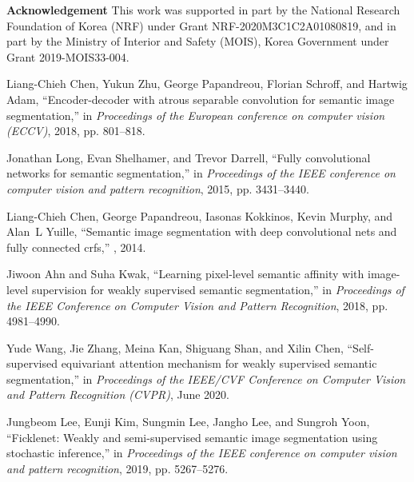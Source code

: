 \documentclass{article}
\begin{document}
\textbf{Acknowledgement} 
This work was supported in part by the National Research Foundation of Korea (NRF) under Grant NRF-2020M3C1C2A01080819, and in part by the Ministry of Interior and Safety (MOIS), Korea Government under Grant 2019-MOIS33-004.  








\begin{thebibliography}{10}

Liang-Chieh Chen, Yukun Zhu, George Papandreou, Florian Schroff, and Hartwig
  Adam,
\newblock ``Encoder-decoder with atrous separable convolution for semantic
  image segmentation,''
\newblock in {\em Proceedings of the European conference on computer vision
  (ECCV)}, 2018, pp. 801--818.

Jonathan Long, Evan Shelhamer, and Trevor Darrell,
\newblock ``Fully convolutional networks for semantic segmentation,''
\newblock in {\em Proceedings of the IEEE conference on computer vision and
  pattern recognition}, 2015, pp. 3431--3440.

Liang-Chieh Chen, George Papandreou, Iasonas Kokkinos, Kevin Murphy, and Alan~L
  Yuille,
\newblock ``Semantic image segmentation with deep convolutional nets and fully
  connected crfs,''
, 2014.

Jiwoon Ahn and Suha Kwak,
\newblock ``Learning pixel-level semantic affinity with image-level supervision
  for weakly supervised semantic segmentation,''
\newblock in {\em Proceedings of the IEEE Conference on Computer Vision and
  Pattern Recognition}, 2018, pp. 4981--4990.

Yude Wang, Jie Zhang, Meina Kan, Shiguang Shan, and Xilin Chen,
\newblock ``Self-supervised equivariant attention mechanism for weakly
  supervised semantic segmentation,''
\newblock in {\em Proceedings of the IEEE/CVF Conference on Computer Vision and
  Pattern Recognition (CVPR)}, June 2020.

Jungbeom Lee, Eunji Kim, Sungmin Lee, Jangho Lee, and Sungroh Yoon,
\newblock ``Ficklenet: Weakly and semi-supervised semantic image segmentation
  using stochastic inference,''
\newblock in {\em Proceedings of the IEEE conference on computer vision and
  pattern recognition}, 2019, pp. 5267--5276.


\end{thebibliography}
\end{document}

